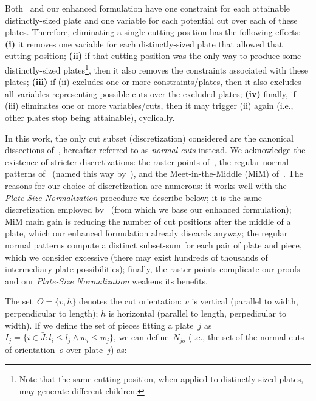 \documentclass[smallextended]{svjour3}       %
\begin{document}
Both~\cite{furini:2016} and our enhanced formulation have one constraint for each attainable distinctly-sized plate and one variable for each potential cut over each of these plates.
Therefore, eliminating a single cutting position has the following effects:
\textbf{(i)} it removes one variable for each distinctly-sized plate that allowed that cutting position;
\textbf{(ii)} if that cutting position was the only way to produce some distinctly-sized plates\footnote{Note that the same cutting position, when applied to distinctly-sized plates, may generate different children.}, then it also removes the constraints associated with these plates;
\textbf{(iii)} if (ii) excludes one or more constraints/plates, then it also excludes all variables representing possible cuts over the excluded plates;
\textbf{(iv)} finally, if (iii) eliminates one or more variables/cuts, then it may trigger (ii) again (i.e., other plates stop being attainable), cyclically.

In this work, the only cut subset (discretization) considered are the canonical dissections of~\cite{herz:1972}, hereafter referred to as \emph{normal cuts} instead.
We acknowledge the existence of stricter discretizations: the raster points of~\cite{terno:1987,guntram:1966}, the regular normal patterns of~\cite{boschetti:2002} (named this way by~\cite{cote:2018}), and the Meet-in-the-Middle (MiM) of~\cite{cote:2018}.
The reasons for our choice of discretization are numerous:
it works well with the \emph{Plate-Size Normalization} procedure we describe below;
it is the same discretization employed by~\cite{furini:2016} (from which we base our enhanced formulation);
MiM main gain is reducing the number of cut positions after the middle of a plate, which our enhanced formulation already discards anyway;
the regular normal patterns compute a distinct subset-sum for each pair of plate and piece, which we consider excessive (there may exist hundreds of thousands of intermediary plate possibilities);
finally, the raster points complicate our proofs and our \emph{Plate-Size Normalization} weakens its benefits.

The set~\(O = \{v, h\}\) denotes the cut orientation: \(v\) is vertical (parallel to width, perpendicular to length); \(h\) is horizontal (parallel to length, perpedicular to width).
If we define the set of pieces fitting a plate~\(j\) as~\(I_j = \{i \in \bar{J} : l_i \leq l_j \land w_i \leq w_j \}\), we can define~\(N_{jo}\) (i.e., the set of the normal cuts of orientation~\(o\) over plate~\(j\)) as:
\end{document}
